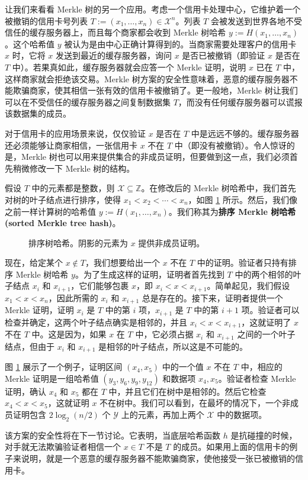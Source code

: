 \begin{snote}[非成员证明。]
让我们来看看 Merkle 树的另一个应用。考虑一个信用卡处理中心，它维护着一个被撤销的信用卡号列表 $T:=(x_1,\dots,x_n)\in\mathcal{X}^n$。列表 $T$ 会被发送到世界各地不受信任的缓存服务器上，而且每个商家都会收到 Merkle 树哈希 $y:=H(x_1,\dots,x_n)$。这个哈希值 $y$ 被认为是由中心正确计算得到的。当商家需要处理客户的信用卡 $x$ 时，它将 $x$ 发送到最近的缓存服务器，询问 $x$ 是否已被撤销（即验证 $x$ 是否在 $T$ 中）。若果真如此，缓存服务器就会应答一个 Merkle 证明，说明 $x$ 已在 $T$ 中，这样商家就会拒绝该交易。Merkle 树方案的安全性意味着，恶意的缓存服务器不能欺骗商家，使其相信一张有效的信用卡被撤销了。更一般地，Merkle 树让我们可以在不受信任的缓存服务器之间复制数据集 $T$，而没有任何缓存服务器可以谎报该数据集的成员。

对于信用卡的应用场景来说，仅仅验证 $x$ 是否在 $T$ 中是远远不够的。缓存服务器还必须能够让商家相信，一张信用卡 $x$ 不在 $T$ 中（即没有被撤销）。令人惊讶的是，Merkle 树也可以用来提供集合的非成员证明，但要做到这一点，我们必须首先稍微修改一下 Merkle 树的结构。

假设 $T$ 中的元素都是整数，则 $\mathcal{X}\subseteq\mathbb{Z}$。在修改后的 Merkle 树哈希中，我们首先对树的叶子结点进行排序，使得 $x_1<x_2<\cdots<x_n$，如图 \ref{fig:8-13} 所示。然后，我们像之前一样计算树的哈希值 $y:=H(x_1,\dots,x_n)$。我们称其为\textbf{排序 Merkle 树哈希 (sorted Merkle tree hash)}。

\begin{figure}
	\centering
	
	\caption{排序树哈希。阴影的元素为 $x$ 提供非成员证明。}
	\label{fig:8-13}
\end{figure}

现在，给定某个 $x\notin T$，我们想要给出一个 $x$ 不在 $T$ 中的证明。验证者只持有排序 Merkle 树哈希 $y$。为了生成这样的证明，证明者首先找到 $T$ 中的两个相邻的叶子结点 $x_i$ 和 $x_{i+1}$，它们能够包裹 $x$，即 $x_i<x<x_{i+1}$。简单起见，我们假设 $x_1<x<x_n$，因此所需的 $x_i$ 和 $x_{i+1}$ 总是存在的。接下来，证明者提供一个 Merkle 证明，证明 $x_i$ 是 $T$ 中的第 $i$ 项，$x_{i+1}$ 是 $T$ 中的第 $i+1$ 项。验证者可以检查并确定，这两个叶子结点确实是相邻的，并且 $x_i<x<x_{i+1}$，这就证明了 $x$ 不在 $T$ 中。这是因为，如果 $x$ 在 $T$ 中，它必须占据 $x_i$ 和 $x_{i+1}$ 之间的一个叶子结点，但由于 $x_i$ 和 $x_{i+1}$ 是相邻的叶子结点，所以这是不可能的。

图 \ref{fig:8-13} 展示了一个例子，证明区间 $(x_4,x_5)$ 中的一个值 $x$ 不在 $T$ 中，相应的 Merkle 证明是一组哈希值 $(y_3,y_6,y_9,y_{12})$ 和数据项 $x_4,x_5$。验证者检查 Merkle 证明，确认 $x_4$ 和 $x_5$ 都在 $T$ 中，并且它们在树中是相邻的。然后它检查 $x_4<x<x_5$，这就证明 $x$ 不在树中。我们可以看到，在最坏的情况下，一个非成员证明包含 $2\log_2({n}/{2})$ 个 $\mathcal{Y}$ 上的元素，再加上两个 $\mathcal{X}$ 中的数据项。

该方案的安全性将在下一节讨论。它表明，当底层哈希函数 $h$ 是抗碰撞的时候，对手就无法欺骗验证者相信一个 $x\in T$ 不是 $T$ 的成员。如果用上面的信用卡的例子来说明，就是一个恶意的缓存服务器不能欺骗商家，使他接受一张已被撤销的信用卡。
\end{snote}

